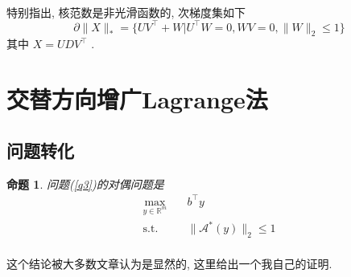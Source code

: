 \documentclass[a4paper, UTF8]{ctexart}				%
\newtheorem{prop}{\bf 命题}[section]			  %
\numberwithin{equation}{section}				%
\newcommand{\upcite}[1]{\textsuperscript{\textsuperscript{\cite{#1}}}}
\begin{document}
			\paragraph{}
				\quad 特别指出, 核范数是非光滑函数的, 次梯度集如下\upcite{watson1992characterization}
				\begin{equation}\label{NuNormSubGrad}
						\partial \lVert{X}\rVert_*
					=	\{U V^\top + W \vert U^\top W = 0,WV = 0, \lVert{W}\rVert_2 \leq 1\}
				\end{equation}
				其中 $X = U D V^\top$ .

	\section{交替方向增广Lagrange法}
		\subsection{问题转化}		
			\begin{prop}
				问题(\ref{q3})的对偶问题是
				\begin{equation}
					\begin{split}\label{dual1}
						\max_{y \in \mathbb{R}^{m}} \quad
							& b^\top y\\
						\text{s.t.} \quad
							& \lVert{\mathcal{A}^*(y)}\rVert_2 \le 1\\
					\end{split}
				\end{equation}
			\end{prop}

			这个结论被大多数文章认为是显然的, 这里给出一个我自己的证明.
\end{document}
